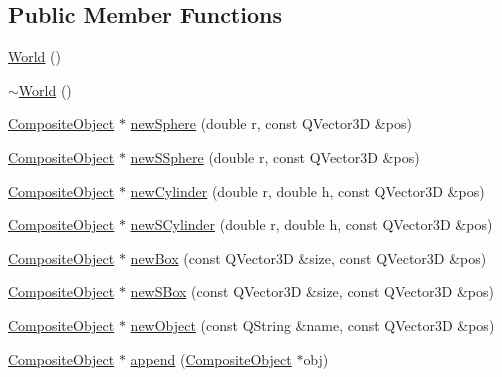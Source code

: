 \subsection*{Public Member Functions}
\begin{DoxyCompactItemize}
\item 
\hyperlink{class_robot_model_1_1_world_afa39d4e6f714a7a3691ac0c656f5e8a8}{World} ()
\item 
\hyperlink{class_robot_model_1_1_world_a8c73fba541a5817fff65147ba47cd827}{$\sim$World} ()
\item 
\hyperlink{class_robot_model_1_1_composite_object}{CompositeObject} $\ast$ \hyperlink{class_robot_model_1_1_world_af9b942f5df468adf15a285b509bc69e5}{newSphere} (double r, const QVector3D \&pos)
\item 
\hyperlink{class_robot_model_1_1_composite_object}{CompositeObject} $\ast$ \hyperlink{class_robot_model_1_1_world_aee6474d33f4ec03a15fa908f06db9748}{newSSphere} (double r, const QVector3D \&pos)
\item 
\hyperlink{class_robot_model_1_1_composite_object}{CompositeObject} $\ast$ \hyperlink{class_robot_model_1_1_world_a8dd79f7cf657eda9de58181bc9fbb564}{newCylinder} (double r, double h, const QVector3D \&pos)
\item 
\hyperlink{class_robot_model_1_1_composite_object}{CompositeObject} $\ast$ \hyperlink{class_robot_model_1_1_world_a36ee6c4337fbe9097f2bc30a1843cdb5}{newSCylinder} (double r, double h, const QVector3D \&pos)
\item 
\hyperlink{class_robot_model_1_1_composite_object}{CompositeObject} $\ast$ \hyperlink{class_robot_model_1_1_world_a9c100912af0adb5275b73b6660efe475}{newBox} (const QVector3D \&size, const QVector3D \&pos)
\item 
\hyperlink{class_robot_model_1_1_composite_object}{CompositeObject} $\ast$ \hyperlink{class_robot_model_1_1_world_adf2304f9f78471e03d2962b326fe4ce9}{newSBox} (const QVector3D \&size, const QVector3D \&pos)
\item 
\hyperlink{class_robot_model_1_1_composite_object}{CompositeObject} $\ast$ \hyperlink{class_robot_model_1_1_world_a82289c85d931bffc967a90a12e04477a}{newObject} (const QString \&name, const QVector3D \&pos)
\item 
\hyperlink{class_robot_model_1_1_composite_object}{CompositeObject} $\ast$ \hyperlink{class_robot_model_1_1_world_adbfd8acea10b8375ed35c737afd5b929}{append} (\hyperlink{class_robot_model_1_1_composite_object}{CompositeObject} $\ast$obj)
\item 

\end{DoxyCompactItemize}
